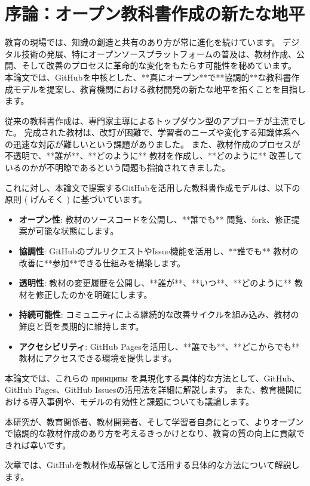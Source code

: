 \section{序論：オープン教科書作成の新たな地平}

教育の現場では、知識の創造と共有のあり方が常に進化を続けています。
デジタル技術の発展、特にオープンソースプラットフォームの普及は、教材作成、公開、そして改善のプロセスに革命的な変化をもたらす可能性を秘めています。
本論文では、GitHubを中核とした、**真にオープン**で**協調的**な教科書作成モデルを提案し、教育機関における教材開発の新たな地平を拓くことを目指します。

従来の教科書作成は、専門家主導によるトップダウン型のアプローチが主流でした。
完成された教材は、改訂が困難で、学習者のニーズや変化する知識体系への迅速な対応が難しいという課題がありました。
また、教材作成のプロセスが不透明で、**誰が**、**どのように** 教材を作成し、**どのように** 改善しているのかが不明瞭であるという問題も指摘されてきました。

これに対し、本論文で提案するGitHubを活用した教科書作成モデルは、以下の 原則 ( げんそく ) に基づいています。

\begin{itemize}
    \item \textbf{オープン性}: 教材のソースコードを公開し、**誰でも** 閲覧、fork、修正提案が可能な状態にします。
    \item \textbf{協調性}: GitHubのプルリクエストやIssue機能を活用し、**誰でも** 教材の改善に**参加**できる仕組みを構築します。
    \item \textbf{透明性}: 教材の変更履歴を公開し、**誰が**、**いつ**、**どのように** 教材を修正したのかを明確にします。
    \item \textbf{持続可能性}: コミュニティによる継続的な改善サイクルを組み込み、教材の鮮度と質を長期的に維持します。
    \item \textbf{アクセシビリティ}: GitHub Pagesを活用し、**誰でも**、**どこからでも** 教材にアクセスできる環境を提供します。
\end{itemize}

本論文では、これらの принципы を具現化する具体的な方法として、GitHub、GitHub Pages、GitHub Issuesの活用法を詳細に解説します。
また、教育機関における導入事例や、モデルの有効性と課題についても議論します。

本研究が、教育関係者、教材開発者、そして学習者自身にとって、よりオープンで協調的な教材作成のあり方を考えるきっかけとなり、教育の質の向上に貢献できれば幸いです。

次章では、GitHubを教材作成基盤として活用する具体的な方法について解説します。
